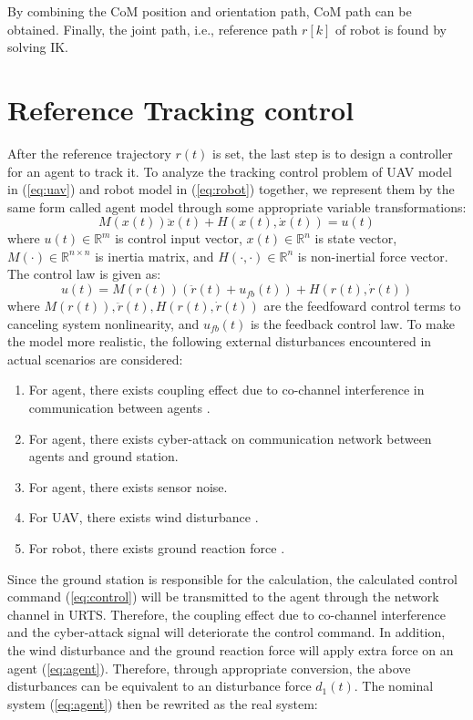 \documentclass{ieeeaccess}
\begin{document}
By combining the CoM position and orientation path, CoM path can be obtained. Finally, the joint path, i.e., reference path $r[k]$ of robot is found by solving IK.

\section{Reference Tracking control}
After the reference trajectory $r(t)$ is set, the last step is to design a controller for an agent to track it. To analyze the tracking control problem of UAV model in (\ref{eq:uav}) and robot model in (\ref{eq:robot}) together, we represent them by the same form called agent model through some appropriate variable transformations:
\begin{equation} \label{eq:agent} 
    M(x(t))\ddot{x}(t) + H(x(t),\dot{x}(t)) = u(t)
\end{equation}
where $u(t)\in\mathbb{R}^m$ is control input vector, $x(t)\in\mathbb{R}^n$ is state vector, $M(\cdot)\in\mathbb{R}^{n\times n}$ is inertia matrix, and $H(\cdot, \cdot)\in\mathbb{R}^n$ is non-inertial force vector. The control law is given as:
\begin{equation} \label{eq:control}
    u(t)= M(r(t))(\ddot{r}(t) + u_{fb}(t)) + H(r(t),\dot{r}(t)) 
\end{equation}
where $M(r(t)),\ddot{r}(t),H(r(t),\dot{r}(t))$ are the feedfoward control terms to canceling system nonlinearity, and $u_{fb}(t)$ is the feedback control law. To make the model more realistic, the following external disturbances encountered in actual scenarios are considered:
\begin{enumerate}
    \item For agent, there exists coupling effect due to co-channel interference in communication between agents \cite{9448458}.
    \item For agent, there exists cyber-attack on communication network between agents and ground station.
    \item For agent, there exists sensor noise.
    \item For UAV, there exists wind disturbance \cite{9075385}.
    \item For robot, there exists ground reaction force \cite{chen2013human}. 
\end{enumerate}
Since the ground station is responsible for the calculation, the calculated control command (\ref{eq:control}) will be transmitted to the agent through the network channel in URTS. Therefore, the coupling effect due to co-channel interference and the cyber-attack signal will deteriorate the control command. In addition, the wind disturbance and the ground reaction force will apply extra force on an agent (\ref{eq:agent}). Therefore, through appropriate conversion, the above disturbances can be equivalent to an disturbance force $d_1(t)$. The nominal system (\ref{eq:agent}) then be rewrited as the real system:
\end{document}
